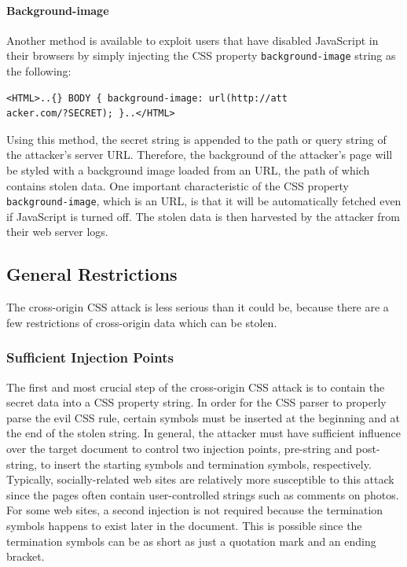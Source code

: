 \documentclass{acm_proc_article-sp}
\begin{document}
{\paragraph{Background-image}
Another method is available to exploit users that have disabled JavaScript in their browsers by simply injecting the CSS property \texttt{background-image} string as the following:
\begin{verbatim}
<HTML>..{} BODY { background-image: url(http://att
acker.com/?SECRET); }..</HTML>
\end{verbatim}
Using this method, the secret string is appended to the path or query string of the attacker's server URL. Therefore, the background of the attacker's page will be styled with a background image loaded from an URL, the path of which contains stolen data. One important characteristic of the CSS property \texttt{background-image}, which is an URL, is that it will be automatically fetched even if JavaScript is turned off. The stolen data is then harvested by the attacker from their web server logs.

\subsection{General Restrictions}
The cross-origin CSS attack is less serious than it could be, because there are a few restrictions of cross-origin data which can be stolen.

\subsubsection{Sufficient Injection Points}
The first and most crucial step of the cross-origin CSS attack is to contain the secret data into a CSS property string. In order for the CSS parser to properly parse the evil CSS rule, certain symbols must be inserted at the beginning and at the end of the stolen string. In general, the attacker must have sufficient influence over the target document to control two injection points, pre-string and post-string, to insert the starting symbols and termination symbols, respectively. Typically, socially-related web sites are relatively more susceptible to this attack since the pages often contain user-controlled strings such as comments on photos. For some web sites, a second injection is not required because the termination symbols happens to exist later in the document. This is possible since the termination symbols can be as short as just a quotation mark and an ending bracket. 

}
\end{document}
